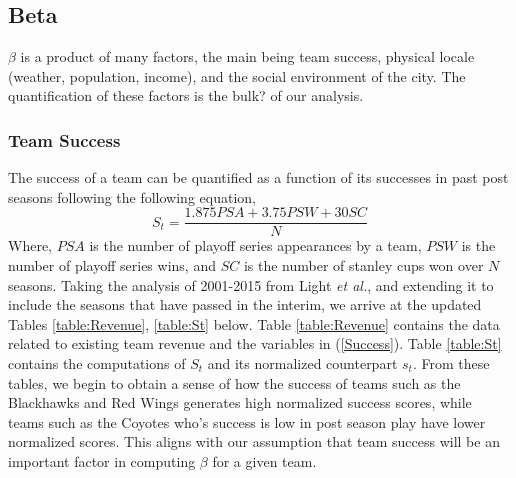 \documentclass[11pt]{report}            %
\begin{document}
\subsection*{Beta}
$\beta$ is a product of many factors, the main being team success, physical locale (weather, population, income), and the social environment of the city\cite{light}. The quantification of these factors is the bulk? of our analysis.
\subsubsection*{Team Success}
The success of a team can be quantified as a function of its successes in past post seasons following the following equation,
\begin{equation}\label{Success}
S_t = \frac{1.875PSA+3.75PSW+30SC}{N}
\end{equation}
Where, $PSA$ is the number of playoff series appearances by a team, $PSW$ is the number of playoff series wins, and $SC$ is the number of stanley cups won over $N$ seasons. Taking the analysis of 2001-2015 from Light \textit{et al.}\cite{light}, and extending it to include the seasons that have passed in the interim, we arrive at the updated Tables \ref{table:Revenue}, \ref{table:St} below. Table \ref{table:Revenue} contains the data related to existing team revenue and the variables in (\ref{Success}). Table \ref{table:St} contains the computations of $S_t$ and its normalized counterpart $s_t$. From these tables, we begin to obtain a sense of how the success of teams such as the Blackhawks and Red Wings generates high normalized success scores, while teams such as the Coyotes who's success is low in post season play have lower normalized scores. This aligns with our assumption that team success will be an important factor in computing $\beta$ for a given team.
\end{document}
